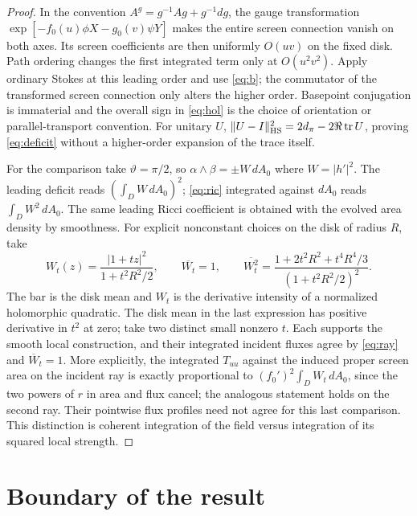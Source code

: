 \documentclass[11pt]{article}
\newcommand{\tr}{\operatorname{tr}}
\begin{document}
\begin{proof}
In the convention \(A^g=g^{-1}Ag+g^{-1}dg\), the gauge transformation
\(\exp[-f_0(u)\phi X-g_0(v)\psi Y]\) makes the entire screen connection vanish on both axes. Its screen coefficients are then uniformly \(O(uv)\) on the fixed disk. Path ordering changes the first integrated term only at \(O(u^2v^2)\). Apply ordinary Stokes at this leading order and use \eqref{eq:b}; the commutator of the transformed screen connection only alters the higher order. Basepoint conjugation is immaterial and the overall sign in \eqref{eq:hol} is the choice of orientation or parallel-transport convention. For unitary \(U\),
\(\|U-I\|_{\rm HS}^2=2d_\pi-2\Re\tr U\), proving \eqref{eq:deficit} without a higher-order expansion of the trace itself.

For the comparison take \(\vartheta=\pi/2\), so \(\alpha\wedge\beta=\pm W\,dA_0\) where \(W=|h'|^2\). The leading deficit reads \((\int_D W\,dA_0)^2\); \eqref{eq:ric} integrated against \(dA_0\) reads \(\int_D W^2\,dA_0\). The same leading Ricci coefficient is obtained with the evolved area density by smoothness. For explicit nonconstant choices on the disk of radius \(R\), take
\[
 W_t(z)=\frac{|1+tz|^2}{1+t^2R^2/2},\qquad
 \overline{W_t}=1,\qquad
 \overline{W_t^2}=\frac{1+2t^2R^2+t^4R^4/3}{(1+t^2R^2/2)^2}.
\]
The bar is the disk mean and \(W_t\) is the derivative intensity of a normalized holomorphic quadratic. The disk mean in the last expression has positive derivative in \(t^2\) at zero; take two distinct small nonzero \(t\). Each supports the smooth local construction, and their integrated incident fluxes agree by \eqref{eq:ray} and \(\overline W_t=1\). More explicitly, the integrated \(T_{uu}\) against the induced proper screen area on the incident ray is exactly proportional to \((f_0')^2\int_D W_t\,dA_0\), since the two powers of \(r\) in area and flux cancel; the analogous statement holds on the second ray. Their pointwise flux profiles need not agree for this last comparison. This distinction is coherent integration of the field versus integration of its squared local strength.
\end{proof}

\section{Boundary of the result}
\end{document}
